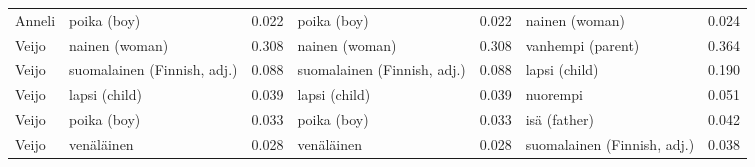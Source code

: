 \begin{longtable}{llrlrlr}
Anneli &                 poika (boy) &                            0.022 &                 poika (boy) &                                 0.022 &              nainen (woman) &                           0.024 \\
 Veijo &              nainen (woman) &                            0.308 &              nainen (woman) &                                 0.308 &           vanhempi (parent) &                           0.364 \\
 Veijo & suomalainen (Finnish, adj.) &                            0.088 & suomalainen (Finnish, adj.) &                                 0.088 &               lapsi (child) &                           0.190 \\
 Veijo &               lapsi (child) &                            0.039 &               lapsi (child) &                                 0.039 &                    nuorempi &                           0.051 \\
 Veijo &                 poika (boy) &                            0.033 &                 poika (boy) &                                 0.033 &                isä (father) &                           0.042 \\
 Veijo &                  venäläinen &                            0.028 &                  venäläinen &                                 0.028 & suomalainen (Finnish, adj.) &                           0.038 \\
\end{longtable}
